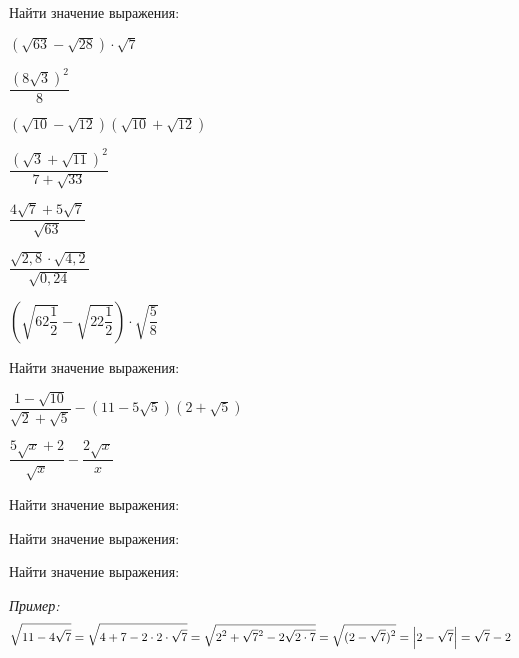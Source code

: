 \setlength\fboxrule{1.2pt}
\begin{listofex}
	\item Найти значение выражения:
	\begin{enumcols}[itemcolumns=3]
		\item \( (\sqrt{63}-\sqrt{28}) \cdot \sqrt{7} \)
		\item \( \dfrac{(8\sqrt{3})^2}{8} \)
		\item \( (\sqrt{10}-\sqrt{12})(\sqrt{10}+\sqrt{12}) \)
		\item \( \dfrac{(\sqrt{3}+\sqrt{11})^2}{7+\sqrt{33}} \)
		\item \( \dfrac{4\sqrt{7}+5\sqrt{7}}{\sqrt{63}} \)
		\item \( \dfrac{\sqrt{2,8} \cdot \sqrt{4,2}}{\sqrt{0,24}} \)
		\item \( \left( \sqrt{62\dfrac{1}{2}}-\sqrt{22\dfrac{1}{2}} \right)\cdot\sqrt{\dfrac{5}{8}} \)
	\end{enumcols}
	\item Найти значение выражения:
	\begin{enumcols}[itemcolumns=2]
		\item \( \dfrac{1-\sqrt{10}}{\sqrt{2}+\sqrt{5}}-(11-5\sqrt{5})(2+\sqrt{5}) \)
		\item \( \dfrac{5\sqrt{x}+2}{\sqrt{x}}-\dfrac{2\sqrt{x}}{x} \)
	\end{enumcols}
	\item Найти значение выражения:
	\begin{enumcols}[itemcolumns=1]
		\item {}
		\item {}
	\end{enumcols}
	\item {}
	\item Найти значение выражения:
	\begin{enumcols}[itemcolumns=2]
		\item {}
		\item {}
		\item {}
		\item {}
	\end{enumcols}
	\item {}
	\item Найти значение выражения:
	
	\textit{Пример:} \[ \sqrt{11-4\sqrt{7}}=\sqrt{4+7-2\cdot2\cdot\sqrt{7}}=\sqrt{\displaystyle2\mathstrut^2+\sqrt{7}\mathstrut^2-2\sqrt{2\cdot7}}=\sqrt{\displaystyle(2-\sqrt{7})^2}=\left|2-\sqrt{7}\right|=\sqrt{7} - 2 \]
	\begin{enumcols}[itemcolumns=2]
		\item {}
		\item {}
	\end{enumcols}
\end{listofex}